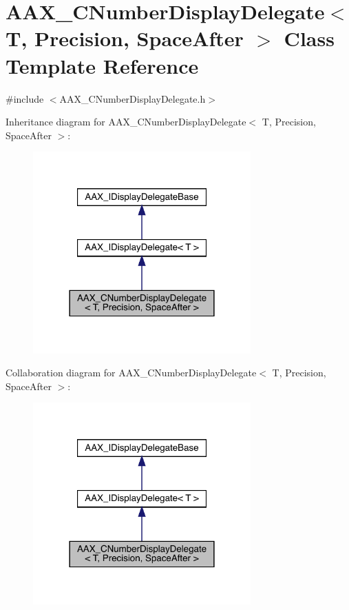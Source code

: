\hypertarget{a01509}{}\section{A\+A\+X\+\_\+\+C\+Number\+Display\+Delegate$<$ T, Precision, Space\+After $>$ Class Template Reference}
\label{a01509}


{\ttfamily \#include $<$A\+A\+X\+\_\+\+C\+Number\+Display\+Delegate.\+h$>$}



Inheritance diagram for A\+A\+X\+\_\+\+C\+Number\+Display\+Delegate$<$ T, Precision, Space\+After $>$\+:
\nopagebreak
\begin{figure}[H]
\begin{center}
\leavevmode
\includegraphics[width=237pt]{a01508}
\end{center}
\end{figure}


Collaboration diagram for A\+A\+X\+\_\+\+C\+Number\+Display\+Delegate$<$ T, Precision, Space\+After $>$\+:
\nopagebreak
\begin{figure}[H]
\begin{center}
\leavevmode
\includegraphics[width=237pt]{a01507}
\end{center}
\end{figure}


